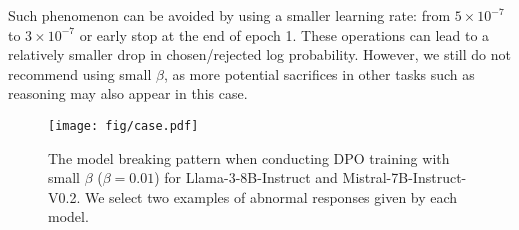 Such phenomenon can be avoided by using a smaller learning rate: from $5\times10^{-7}$ to $3\times10^{-7}$ or early stop at the end of epoch 1. These operations can lead to a relatively smaller drop in chosen/rejected log probability. However, we still do not recommend using small $\beta$, as more potential sacrifices in other tasks such as reasoning may also appear in this case.

\begin{figure*}[h]
  \centering
  \texttt{[image: fig/case.pdf]}
  \vspace{-15pt}
  \caption{The model breaking pattern when conducting DPO training with small $\beta$ ($\beta=0.01$) for Llama-3-8B-Instruct and Mistral-7B-Instruct-V0.2. We select two examples of abnormal responses given by each model.}
  \label{fig:case}
  \vspace{-5pt}
\end{figure*}